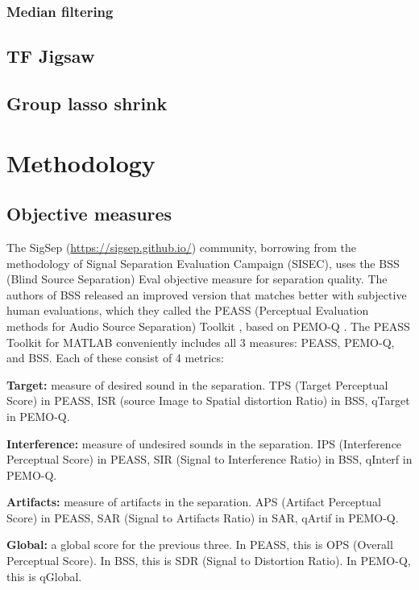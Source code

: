 \documentclass[letter,12pt]{article}
\newenvironment{tight_itemize}{
\begin{itemize}
  \setlength{\itemsep}{0pt}
  \setlength{\parskip}{0pt}
}{\end{itemize}}
\begin{document}
\subsubsection{Median filtering}

\subsection{TF Jigsaw}

\subsection{Group lasso shrink}

\section{Methodology}
\label{sec:methodology}

\subsection{Objective measures}

The SigSep (\href{https://sigsep.github.io/}{https://sigsep.github.io/}) community, borrowing from the methodology of Signal Separation Evaluation Campaign (SISEC), uses the BSS (Blind Source Separation) Eval \cite{bss} objective measure for separation quality. The authors of BSS released an improved version that matches better with subjective human evaluations, which they called the PEASS (Perceptual Evaluation methods for Audio Source Separation) Toolkit \cite{peass}, based on PEMO-Q \cite{pemoq}. The PEASS Toolkit for MATLAB \cite{peassmatlab} conveniently includes all 3 measures: PEASS, PEMO-Q, and BSS. Each of these consist of 4 metrics:

\begin{tight_itemize}
\item
	\textbf{Target:} measure of desired sound in the separation. TPS (Target Perceptual Score) in PEASS, ISR (source Image to Spatial distortion Ratio) in BSS, qTarget in PEMO-Q.
\item
	\textbf{Interference:} measure of undesired sounds in the separation. IPS (Interference Perceptual Score) in PEASS, SIR (Signal to Interference Ratio) in BSS, qInterf in PEMO-Q.
\item
	\textbf{Artifacts:} measure of artifacts in the separation. APS (Artifact Perceptual Score) in PEASS, SAR (Signal to Artifacts Ratio) in SAR, qArtif in PEMO-Q.
\item
	\textbf{Global:} a global score for the previous three. In PEASS, this is OPS (Overall Perceptual Score). In BSS, this is SDR (Signal to Distortion Ratio). In PEMO-Q, this is qGlobal.
\end{tight_itemize}
\end{document}
